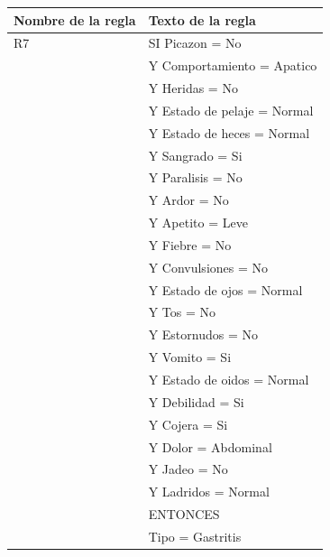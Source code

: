 \documentclass[a4paper,table,xcdraw]{article}
\begin{document}
\begin{table}[H]
\centering
\begin{tabular}{|l|l|}
\hline
\textbf{Nombre de la regla} & Texto de la regla \\ \hline
R7 & SI Picazon = No \\
  & Y Comportamiento = Apatico \\
  & Y Heridas = No \\
  & Y Estado de pelaje = Normal \\
  & Y Estado de heces = Normal \\
  & Y Sangrado = Si \\
  & Y Paralisis = No \\
  & Y Ardor = No \\
  & Y Apetito = Leve \\
  & Y Fiebre = No \\
  & Y Convulsiones = No \\
  & Y Estado de ojos = Normal \\
  & Y Tos = No \\
  & Y Estornudos = No \\
  & Y Vomito = Si \\
  & Y Estado de oidos = Normal \\
  & Y Debilidad = Si \\
  & Y Cojera = Si \\
  & Y Dolor = Abdominal \\
  & Y Jadeo = No \\
  & Y Ladridos = Normal \\
  &   ENTONCES \\
  & Tipo = Gastritis \\ \hline
\end{tabular}
\end{table}
  
\end{document}
